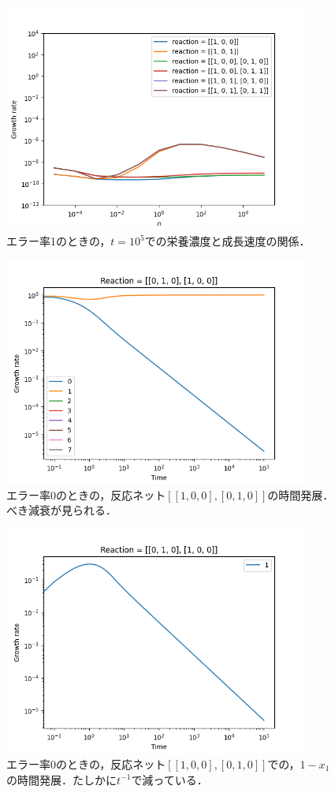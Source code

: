 \documentclass[a4paper,11pt]{jsarticle}
\begin{document}
\begin{figure}[htbp]
  \centering
  \includegraphics[width=10cm]{waste_err1_ng_reac.png}
  \caption{エラー率1のときの，$t=10^5$での栄養濃度と成長速度の関係．}
  \label{fig:err1_ng_reac}
\end{figure}

\begin{figure}[htbp]
  \centering
  \includegraphics[width=10cm]{waste_err0_tc_reac1.png}
  \caption{エラー率0のときの，反応ネット$[[1,0,0],[0,1,0]]$の時間発展．べき減衰が見られる．}
  \label{fig:err0_tc_reac1}
\end{figure}

\begin{figure}[htbp]
  \centering
  \includegraphics[width=10cm]{waste_err0_tc_reac1_check.png}
  \caption{エラー率0のときの，反応ネット$[[1,0,0],[0,1,0]]$での，$1-x_1$の時間発展．たしかに$t^{-1}$で減っている．}
  \label{fig:err0_tc_reac1_check}
\end{figure}
\end{document}
